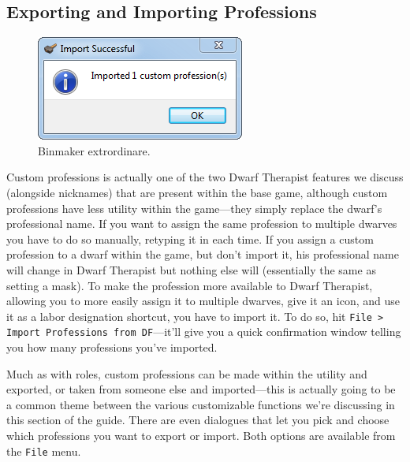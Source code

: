 \documentclass[]{article}
\begin{document}
\subsection{Exporting and Importing Professions}
\label{sec:Exporting and Importing Professions}
\begin{figure}
\vspace{-20pt}
  \begin{center}
    \includegraphics{Sec3Fig12}
  \end{center}
\vspace{-15pt}
\caption{Binmaker extrordinare.}
\end{figure}
Custom professions is actually one of the two Dwarf Therapist features we discuss (alongside
nicknames) that are present within the base game, although custom professions have less utility within
the game---they simply replace the dwarf's professional name. If you want to assign the same profession
to multiple dwarves you have to do so manually, retyping it in each time. If you assign a custom
profession to a dwarf within the game, but don't import it, his professional name will change in Dwarf
Therapist but nothing else will (essentially the same as setting a mask). To make the profession more
available to Dwarf Therapist, allowing you to more easily assign it to multiple dwarves, give it an icon,
and use it as a labor designation shortcut, you have to import it. To do so, hit \texttt{File > Import
Professions from DF}---it'll give you a quick confirmation window telling you how many professions you've
imported.

Much as with roles, custom professions can be made within the utility and exported, or taken from someone
else and imported---this is actually going to be a common theme between the various customizable
functions we're discussing in this section of the guide. There are even dialogues that let you pick and
choose which professions you want to export or import. Both options are available from the \texttt{File}
menu.
\end{document}
